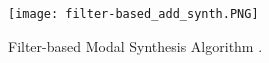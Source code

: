 \begin{figure}[H]
  \centering
    \texttt{[image: filter-based\_add\_synth.PNG]}
      \caption{Filter-based Modal Synthesis Algorithm \cite{Cook:2002:RSS:515316}.}
      \label{fig:filter_synth}
\end{figure}

